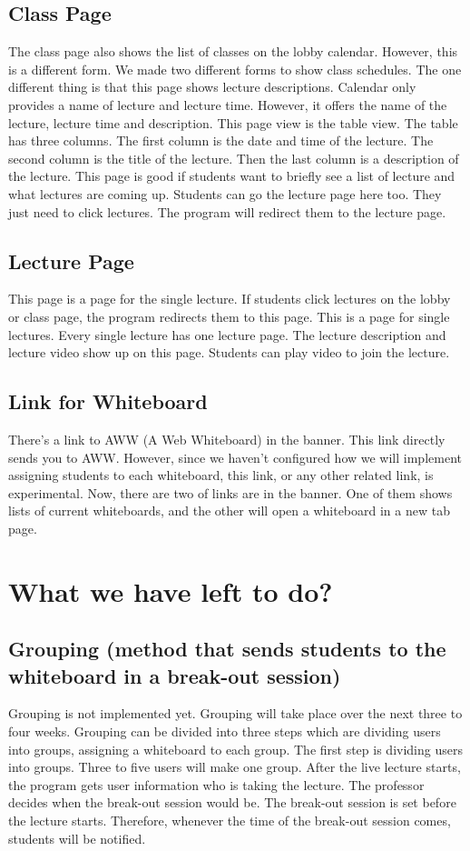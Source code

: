 \documentclass[10pt, letterpaper]{article}
\begin{document}
    \subsection{Class Page}
        The class page also shows the list of classes on the lobby calendar. However, this is a different form. We made two different forms to show class schedules. The one different thing is that this page shows lecture descriptions. Calendar only provides a name of lecture and lecture time. However, it offers the name of the lecture, lecture time and description. This page view is the table view. The table has three columns. The first column is the date and time of the lecture. The second column is the title of the lecture. Then the last column is a description of the lecture. This page is good if students want to briefly see a list of lecture and what lectures are coming up. Students can go the lecture page here too. They just need to click lectures. The program will redirect them to the lecture page.
        
    \subsection{Lecture Page}
        This page is a page for the single lecture. If students click lectures on the lobby or class page, the program redirects them to this page. This is a page for single lectures. Every single lecture has one lecture page. The lecture description and lecture video show up on this page. Students can play video to join the lecture.

    \clearpage
    \subsection{Link for Whiteboard}
        There’s a link to AWW (A Web Whiteboard) in the banner. This link directly sends   you to AWW. However, since we haven’t configured how we will implement assigning students to each whiteboard, this link, or any other related link, is experimental. Now, there are two of links are in the banner. One of them shows lists of current whiteboards, and the other will open a whiteboard in a new tab page. 
        
\section{What we have left to do?}
    \subsection{Grouping (method that sends students to the whiteboard in a break-out session)}
    Grouping is not implemented yet. Grouping will take place over the next three to four weeks. Grouping can be divided into three steps which are dividing users into groups, assigning a whiteboard to each group. The first step is dividing users into groups. Three to five users will make one group. After the live lecture starts, the program gets user information who is taking the lecture. The professor decides when the break-out session would be. The break-out session is set before the lecture starts. Therefore, whenever the time of the break-out session comes, students will be notified. 
        
\end{document}
